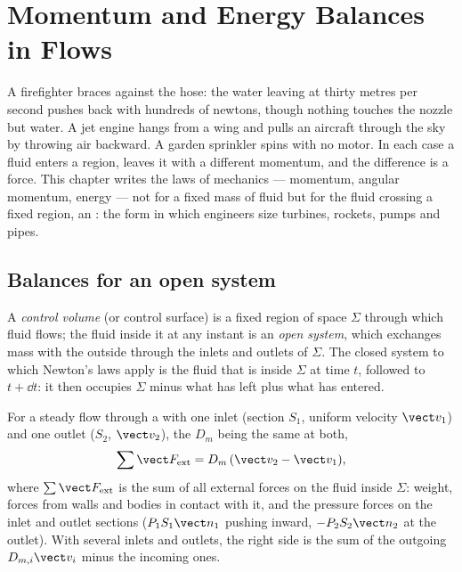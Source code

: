 \chapter{Momentum and Energy Balances in Flows}\label{ch:b2:flow-balances}

A firefighter braces against the hose: the water leaving at thirty
metres per second pushes back with hundreds of newtons, though nothing
touches the nozzle but water. A jet engine hangs from a wing and pulls
an aircraft through the sky by throwing air backward. A garden
sprinkler spins with no motor. In each case a fluid enters a region,
leaves it with a different momentum, and the difference is a force.
This chapter writes the laws of mechanics --- momentum, angular
momentum, energy --- not for a fixed mass of fluid but for the fluid
crossing a fixed region, an \emph{}: the form in which
engineers size turbines, rockets, pumps and pipes.

\section{Balances for an open system}

\begin{definition}\label{def:b2:flow-balances:cv}
A \emph{control volume} (or control surface) is a fixed region of space
$\Sigma$ through which fluid flows; the fluid inside it at any instant
is an \emph{open system}, which exchanges mass with the outside through
the inlets and outlets of $\Sigma$. The closed system to which Newton's
laws apply is the fluid that is inside $\Sigma$ at time $t$, followed
to $t + \dd t$: it then occupies $\Sigma$ minus what has left plus what
has entered.
\end{definition}

\begin{theorem}\label{thm:b2:flow-balances:momentum}
For a steady flow through a  with one inlet (section
$S_1$, uniform velocity $\vect v_1$) and one outlet ($S_2$, $\vect v_2$), the
 $D_m$ being the same at both,
\[
\sum\vect F_{\text{ext}} = D_m\,(\vect v_2 - \vect v_1) ,
\]
where $\sum\vect F_{\text{ext}}$ is the sum of all external forces on the
fluid inside $\Sigma$: weight, forces from walls and bodies in contact
with it, and the pressure forces on the inlet and outlet sections
($P_1S_1\vect n_1$ pushing inward, $-P_2S_2\vect n_2$ at the outlet). With
several inlets and outlets, the right side is the sum of the outgoing
 $D_{m,i}\vect v_i$ minus the incoming ones.
\end{theorem}

